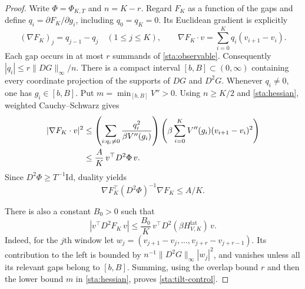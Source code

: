 \documentclass[11pt,reqno]{amsart}
\numberwithin{equation}{section}
\theoremstyle{definition}
\newcommand{\1}{\mathbf 1}
\begin{document}
\begin{proof}
Write $\Phi=\Phi_{K,T}$ and $n=K-r$. Regard $F_K$ as a function of
the gaps and define $q_i=\partial F_K/\partial g_i$, including
$q_0=q_K=0$. Its Euclidean gradient is explicitly
\begin{equation}\label{sta:gradient}
(\nabla F_K)_j=q_{j-1}-q_j\quad(1\le j\le K),
\qquad
\nabla F_K\cdot v=\sum_{i=0}^Kq_i(v_{i+1}-v_i).
\end{equation}
Each gap occurs in at most $r$ summands of \eqref{sta:observable}.
Consequently $|q_i|\le r\|DG\|_\infty/n$. There is a compact interval
$[b,B]\subset(0,\infty)$ containing every coordinate projection of
the supports of $DG$ and $D^2G$. Whenever $q_i\ne0$, one has
$g_i\in[b,B]$. Put $m=\min_{[b,B]}V''>0$.
Using $n\ge K/2$ and \eqref{sta:hessian}, weighted Cauchy--Schwarz gives
\begin{align}
|\nabla F_K\cdot v|^2
&\le\left(\sum_{i:q_i\ne0}
 \frac{q_i^2}{\beta V''(g_i)}\right)
 \left(\beta\sum_{i=0}^K V''(g_i)(v_{i+1}-v_i)^2\right)
 \notag\\
&\le\frac{A}{K}\,v^\top D^2\Phi\,v.
\label{sta:metric-form}
\end{align}
Since $D^2\Phi\ge T^{-1}\mathrm{Id}$, duality yields
\begin{equation}\label{sta:metric-gradient}
\nabla F_K^\top(D^2\Phi)^{-1}\nabla F_K\le A/K.
\end{equation}

There is also a constant $B_0>0$ such that
\begin{equation}\label{sta:tilt-control}
|v^\top D^2F_K\,v|
\le\frac{B_0}{K}\,
 v^\top D^2(\beta H^{\mathrm{lat}}_{V,K})\,v.
\end{equation}
Indeed, for the $j$th window let
$w_j=(v_{j+1}-v_j,\ldots,v_{j+r}-v_{j+r-1})$. Its contribution to the
left is bounded by $n^{-1}\|D^2G\|_\infty|w_j|^2$, and vanishes
unless all its relevant gaps belong to $[b,B]$. Summing, using the
overlap bound $r$ and then the lower bound $m$ in
\eqref{sta:hessian}, proves \eqref{sta:tilt-control}.


\end{proof}
\end{document}
